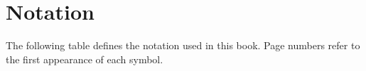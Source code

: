 \chapter*{Notation}

 
The following table defines the  notation used in this book. Page numbers
refer to the first appearance of each symbol.
 
